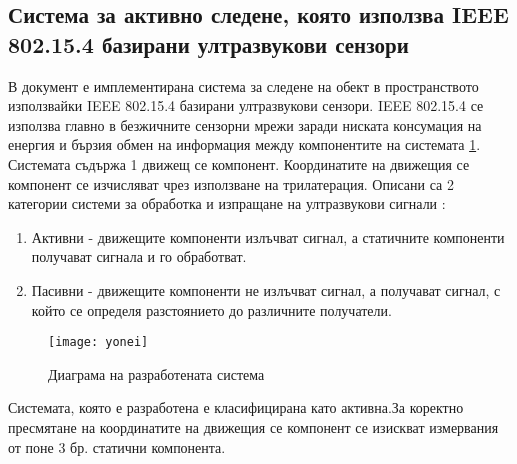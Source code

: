 \subsection{Система за активно следене, която използва IEEE 802.15.4 базирани ултразвукови сензори}

В документ \cite{yonei} е имплементирана система за следене на обект в пространството използвайки IEEE 802.15.4 базирани ултразвукови сензори.
IEEE 802.15.4 се използва главно в безжичните сензорни мрежи заради ниската консумация на енергия и бързия обмен на информация между компонентите на системата \ref{fig:yoneiFig}. Системата съдържа 1 движещ се компонент. Координатите на движещия се компонент се изчисляват чрез използване на трилатерация.  Описани са 2 категории системи за обработка и изпращане на ултразвукови сигнали \cite{sysTypes}:

\begin{enumerate}
    \item Активни - движещите компоненти излъчват сигнал, а статичните компоненти получават сигнала и го обработват.
    \item Пасивни - движещите компоненти не излъчват сигнал, а получават сигнал, с който се определя разстоянието до различните получатели.
\end{enumerate}

\begin{figure}
    \centering
    \texttt{[image: yonei]}
    \caption{Диаграма на разработената система}
    \label{fig:yoneiFig}
\end{figure}


Системата, която е разработена е класифицирана като активна.За коректно пресмятане на координатите на движещия се компонент се изискват измервания от поне 3 бр. статични компонента.

